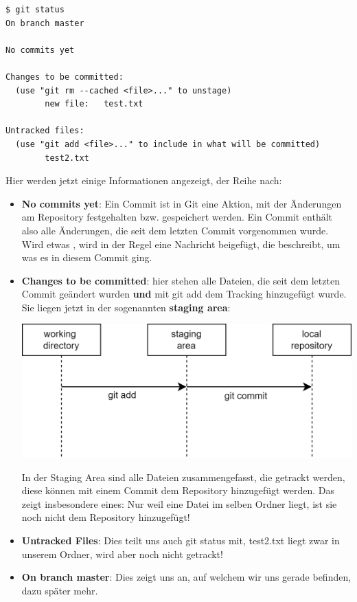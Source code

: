 \documentclass{article}
\begin{document}
\begin{verbatim}
$ git status
On branch master

No commits yet

Changes to be committed:
  (use "git rm --cached <file>..." to unstage)
        new file:   test.txt

Untracked files:
  (use "git add <file>..." to include in what will be committed)
        test2.txt
\end{verbatim}
Hier werden jetzt einige Informationen angezeigt, der Reihe nach: 
\begin{itemize}
    \item \textbf{No commits yet}: Ein Commit ist in Git eine Aktion, mit der Änderungen am Repository festgehalten bzw. gespeichert werden. Ein Commit enthält also alle Änderungen, die seit dem letzten Commit vorgenommen wurde. Wird etwas , wird in der Regel eine Nachricht beigefügt, die beschreibt, um was es in diesem Commit ging. 
    \item \textbf{Changes to be committed}: hier stehen alle Dateien, die seit dem letzten Commit geändert wurden \textbf{und} mit git add dem Tracking hinzugefügt wurde. Sie liegen jetzt in der sogenannten \textbf{staging area}:
    \begin{center}
        \includegraphics[scale=0.25]{../../media/git_staging.png}
    \end{center}
    In der Staging Area sind alle Dateien zusammengefasst, die getrackt werden, diese können mit einem Commit dem Repository hinzugefügt werden. Das zeigt insbesondere eines: Nur weil eine Datei im selben Ordner liegt, ist sie noch nicht dem Repository hinzugefügt!
    \item \textbf{Untracked Files}: Dies teilt uns auch git status mit, test2.txt liegt zwar in unserem Ordner, wird aber noch nicht getrackt!
    \item \textbf{On branch master}: Dies zeigt uns an, auf welchem  wir uns gerade befinden, dazu später mehr. 
\end{itemize}
\end{document}
